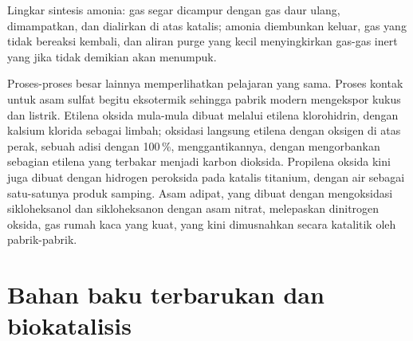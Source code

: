 \begin{omfigure}

{\small Lingkar sintesis amonia: gas segar dicampur dengan gas daur ulang,
dimampatkan, dan dialirkan di atas katalis; amonia diembunkan keluar, gas yang tidak bereaksi
kembali, dan aliran purge yang kecil menyingkirkan gas-gas inert yang jika tidak demikian
akan menumpuk.}
\end{omfigure}

Proses-proses besar lainnya memperlihatkan pelajaran yang sama. Proses kontak untuk asam
sulfat begitu eksotermik sehingga pabrik modern mengekspor kukus dan listrik.
Etilena oksida mula-mula dibuat melalui etilena klorohidrin, dengan kalsium
klorida sebagai limbah; oksidasi langsung etilena dengan oksigen di atas perak, sebuah
adisi dengan  100\,\%, menggantikannya, dengan mengorbankan sebagian etilena yang terbakar menjadi
karbon dioksida. Propilena oksida kini juga dibuat dengan hidrogen peroksida pada
katalis  titanium, dengan air sebagai satu-satunya produk samping. Asam adipat,
yang dibuat dengan mengoksidasi sikloheksanol dan sikloheksanon dengan asam nitrat, melepaskan
dinitrogen oksida, gas rumah kaca yang kuat, yang kini dimusnahkan secara katalitik oleh pabrik-pabrik.

\section{Bahan baku terbarukan dan biokatalisis}

